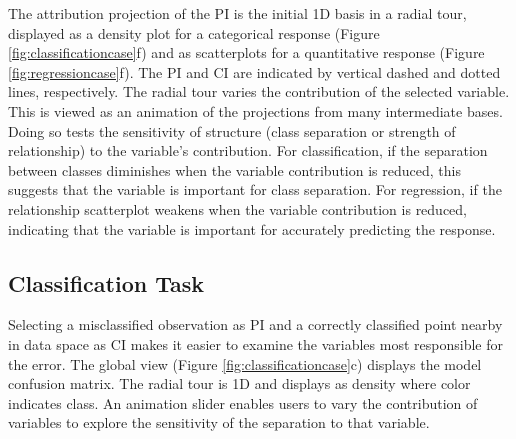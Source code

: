 \documentclass[
]{article}
\begin{document}
The attribution projection of the PI is the initial 1D basis in a radial tour, displayed as a density plot for a categorical response (Figure \ref{fig:classificationcase}f) and as scatterplots for a quantitative response (Figure \ref{fig:regressioncase}f). The PI and CI are indicated by vertical dashed and dotted lines, respectively. The radial tour varies the contribution of the selected variable. This is viewed as an animation of the projections from many intermediate bases. Doing so tests the sensitivity of structure (class separation or strength of relationship) to the variable's contribution. For classification, if the separation between classes diminishes when the variable contribution is reduced, this suggests that the variable is important for class separation. For regression, if the relationship scatterplot weakens when the variable contribution is reduced, indicating that the variable is important for accurately predicting the response.

\hypertarget{classification-task}{%
\subsection{Classification Task}\label{classification-task}}

Selecting a misclassified observation as PI and a correctly classified point nearby in data space as CI makes it easier to examine the variables most responsible for the error. The global view (Figure \ref{fig:classificationcase}c) displays the model confusion matrix. The radial tour is 1D and displays as density where color indicates class. An animation slider enables users to vary the contribution of variables to explore the sensitivity of the separation to that variable.
\end{document}
